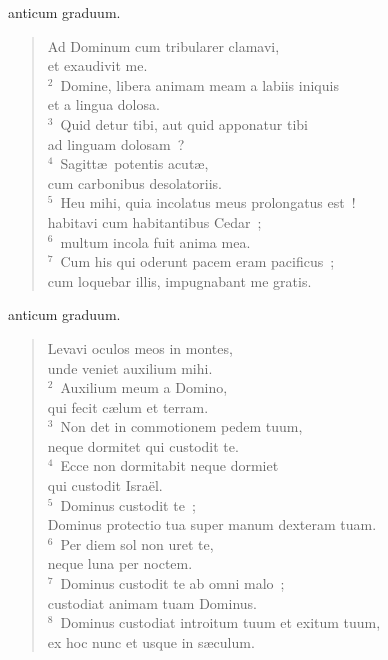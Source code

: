 \bchapter[Psalm]
anticum graduum. \begin{verse}Ad Dominum cum tribularer clamavi,\\ et exaudivit me.\\
${}^{2}$~Domine, libera animam meam a labiis iniquis\\ et a lingua dolosa.\\
${}^{3}$~Quid detur tibi, aut quid apponatur tibi\\ ad linguam dolosam~?\\
${}^{4}$~Sagitt\ae\ potentis acut\ae ,\\ cum carbonibus desolatoriis.\\
${}^{5}$~Heu mihi, quia incolatus meus prolongatus est~!\\ habitavi cum habitantibus Cedar~;\\
${}^{6}$~multum incola fuit anima mea.\\
${}^{7}$~Cum his qui oderunt pacem eram pacificus~;\\ cum loquebar illis, impugnabant me gratis.\end{verse}



\bchapter[Psalm]
anticum graduum. \begin{verse}Levavi oculos meos in montes,\\ unde veniet auxilium mihi.\\
${}^{2}$~Auxilium meum a Domino,\\ qui fecit c\ae lum et terram.\\
${}^{3}$~Non det in commotionem pedem tuum,\\ neque dormitet qui custodit te.\\
${}^{4}$~Ecce non dormitabit neque dormiet\\ qui custodit Isra\"el.\\
${}^{5}$~Dominus custodit te~;\\ Dominus protectio tua super manum dexteram tuam.\\
${}^{6}$~Per diem sol non uret te,\\ neque luna per noctem.\\
${}^{7}$~Dominus custodit te ab omni malo~;\\ custodiat animam tuam Dominus.\\
${}^{8}$~Dominus custodiat introitum tuum et exitum tuum,\\ ex hoc nunc et usque in s\ae culum.\end{verse}



